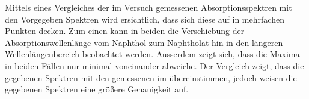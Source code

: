 \documentclass[12pt]{article}
\begin{document}

Mittels eines Vergleiches der im Versuch gemessenen Absorptionsspektren mit den Vorgegeben Spektren wird ersichtlich,
dass sich diese auf in mehrfachen Punkten decken. Zum einen kann in beiden die Verschiebung der Absorptionswellenlänge
vom Naphthol zum Naphtholat hin in den längeren Wellenlängenbereich beobachtet werden. Ausserdem zeigt sich,
dass die Maxima in beiden Fällen nur minimal voneinander abweiche.
Der Vergleich zeigt, dass die gegebenen Spektren mit den gemessenen im übereinstimmen,
jedoch weisen die gegebenen Spektren eine größere Genauigkeit auf.

\printbibliography
\end{document}
